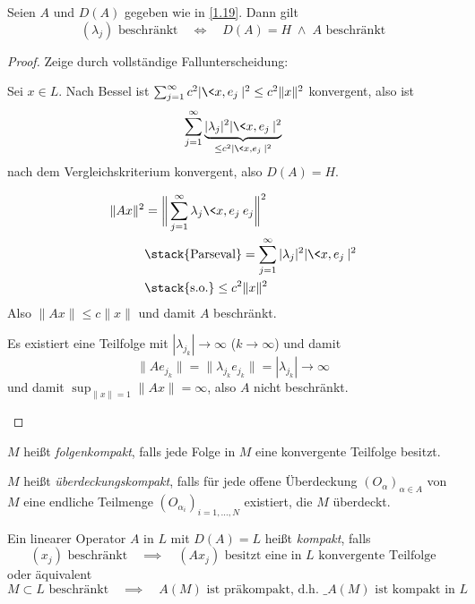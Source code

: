 \documentclass{mycourse}
\begin{document}
\begin{nt} \label{1.24}
	Seien $A$ und $D(A)$ gegeben wie in \ref{1.19}.
	Dann gilt
	\[
		(\lambda_j) \text{ beschränkt} \quad\iff\quad D(A)=H \;\land\; A \text{ beschränkt}
	\]
	\begin{proof}
		Zeige durch vollständige Fallunterscheidung:
		\begin{seg}
			Sei $x \in L$.
			Nach Bessel ist $\sum_{j=1}^\infty c^2 |\<x,e_j\>|^2 \le c^2 \|x\|^2$ konvergent, also ist
			\[
				\sum_{j=1}^\infty \underbrace{|\lambda_j|^2 |\<x,e_j\>|^2}_{\le c^2|\<x,e_j\>|^2}
			\]
			nach dem Vergleichskriterium konvergent, also $D(A) = H$.

			\begin{align*}
				\|Ax\|^2 
				&= \bigg\|\sum_{j=1}^\infty \lambda_j \<x,e_j\> e_j\bigg\|^2 \\
				&\stack{\text{Parseval}} = \sum_{j=1}^\infty |\lambda_j|^2 |\<x,e_j\>|^2 \\
				&\stack{\text{s.o.}}\le c^2 \|x\|^2
			\end{align*}
			Also $\|Ax\| \le c\|x\|$ und damit $A$ beschränkt.
		\end{seg}
		\begin{seg}
			Es existiert eine Teilfolge mit $|\lambda_{j_k}| \to \infty$ ($k\to \infty$) und damit
			\[
				\|A e_{j_k}\| = \|\lambda_{j_k} e_{j_k}\| = |\lambda_{j_k}| \to \infty
			\]
			und damit $\sup_{\|x\|=1} \|Ax\| = \infty$, also $A$ nicht beschränkt.
		\end{seg}
	\end{proof}
\end{nt}

\begin{nt*}
	$M$ heißt \emph{folgenkompakt}, falls jede Folge in $M$ eine konvergente Teilfolge besitzt.

	$M$ heißt \emph{überdeckungskompakt}, falls für jede offene Überdeckung $(O_\alpha)_{\alpha \in A}$ von $M$ eine endliche Teilmenge $(O_{\alpha_i})_{i=1,\dotsc,N}$ existiert, die $M$ überdeckt.
\end{nt*}

\begin{df} \label{1.25}
	Ein linearer Operator $A$ in $L$ mit $D(A) = L$ heißt \emph{kompakt}, falls
	\[
		(x_j) \text{ beschränkt} \quad\implies\quad \text{$(Ax_j)$ besitzt eine in $L$ konvergente Teilfolge}
	\]
	oder äquivalent
	\[
		M \subset L \text{ beschränkt} \quad\implies\quad \text{$A(M)$ ist präkompakt, d.h. $\_{A(M)}$ ist kompakt in $L$}
	\]
\end{df}
\end{document}
